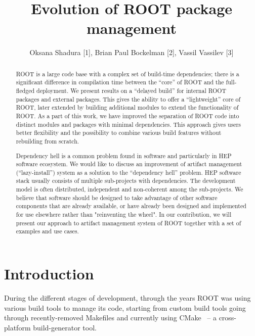 \documentclass[12pt]{iopart}
\begin{document}
\title{Evolution of ROOT package management}

\author{Oksana Shadura [1],  Brian Paul Bockelman  [2],  Vassil Vassilev [3]}
\address{[1] University of Nebraska-Lincoln, USA, [2] Morgridge Institute for Research, USA, [3] Princeton University, USA}
\vspace{10pt}

\begin{abstract}
ROOT is a large code base with a complex set of build-time dependencies; there is a significant difference in compilation time between the “core” of ROOT and the full-fledged deployment. We present results on a “delayed build” for internal ROOT packages and external packages. This gives the ability to offer a “lightweight” core of ROOT, later extended by building additional modules to extend the functionality of ROOT. As a part of this work, we have improved the separation of ROOT code into distinct modules and packages with minimal dependencies. This approach gives users better flexibility and the possibility to combine various build features without rebuilding from scratch.

Dependency hell is a common problem found in software and particularly in HEP software ecosystem. We would like to discuss an improvement of artifact management (“lazy-install”) system as a solution to the “dependency hell” problem. HEP software stack usually consists of multiple sub-projects with dependencies. The development model is often distributed, independent and non-coherent among the sub-projects. We believe that software should be designed to take advantage of other software components that are already available, or have already been designed and implemented for use elsewhere rather than "reinventing the wheel". In our contribution, we will present our approach to artifact management system of ROOT together with a set of examples and use cases.
\end{abstract}

\section{Introduction}

During the different stages of development, through the years ROOT \cite{root} was using various build tools to manage its code, starting from custom build tools going through recently-removed Makefiles and currently using CMake~\cite{cmake} -- a cross-platform build-generator tool.
\end{document}
